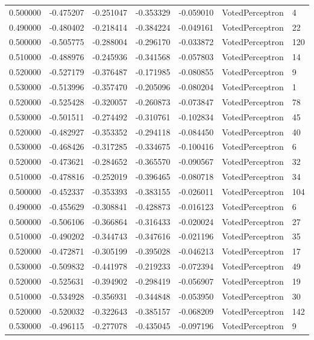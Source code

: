 \begin{tabular}{rrrrrll}
0.500000 & -0.475207 & -0.251047 & -0.353329 & -0.059010 & VotedPerceptron & 4 \\
0.490000 & -0.480402 & -0.218414 & -0.384224 & -0.049161 & VotedPerceptron & 22 \\
0.500000 & -0.505775 & -0.288004 & -0.296170 & -0.033872 & VotedPerceptron & 120 \\
0.510000 & -0.488976 & -0.245936 & -0.341568 & -0.057803 & VotedPerceptron & 14 \\
0.520000 & -0.527179 & -0.376487 & -0.171985 & -0.080855 & VotedPerceptron & 9 \\
0.530000 & -0.513996 & -0.357470 & -0.205096 & -0.080204 & VotedPerceptron & 1 \\
0.520000 & -0.525428 & -0.320057 & -0.260873 & -0.073847 & VotedPerceptron & 78 \\
0.530000 & -0.501511 & -0.274492 & -0.310761 & -0.102834 & VotedPerceptron & 45 \\
0.520000 & -0.482927 & -0.353352 & -0.294118 & -0.084450 & VotedPerceptron & 40 \\
0.530000 & -0.468426 & -0.317285 & -0.334675 & -0.100416 & VotedPerceptron & 6 \\
0.520000 & -0.473621 & -0.284652 & -0.365570 & -0.090567 & VotedPerceptron & 32 \\
0.510000 & -0.478816 & -0.252019 & -0.396465 & -0.080718 & VotedPerceptron & 34 \\
0.500000 & -0.452337 & -0.353393 & -0.383155 & -0.026011 & VotedPerceptron & 104 \\
0.490000 & -0.455629 & -0.308841 & -0.428873 & -0.016123 & VotedPerceptron & 6 \\
0.500000 & -0.506106 & -0.366864 & -0.316433 & -0.020024 & VotedPerceptron & 27 \\
0.510000 & -0.490202 & -0.344743 & -0.347616 & -0.021196 & VotedPerceptron & 35 \\
0.520000 & -0.472871 & -0.305199 & -0.395028 & -0.046213 & VotedPerceptron & 17 \\
0.530000 & -0.509832 & -0.441978 & -0.219233 & -0.072394 & VotedPerceptron & 49 \\
0.520000 & -0.525631 & -0.394902 & -0.298419 & -0.056907 & VotedPerceptron & 19 \\
0.510000 & -0.534928 & -0.356931 & -0.344848 & -0.053950 & VotedPerceptron & 30 \\
0.520000 & -0.520032 & -0.322643 & -0.385157 & -0.068209 & VotedPerceptron & 142 \\
0.530000 & -0.496115 & -0.277078 & -0.435045 & -0.097196 & VotedPerceptron & 9 \\

\end{tabular}
